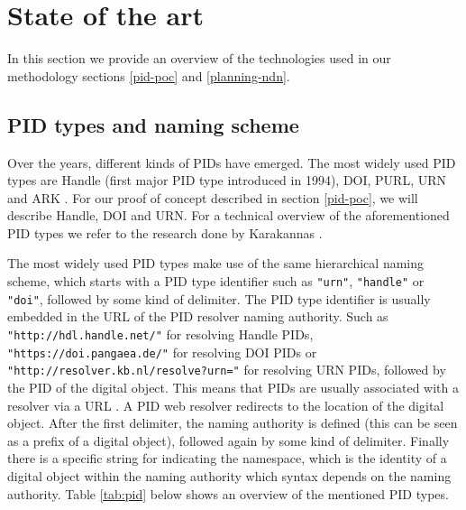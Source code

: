 \section{State of the art}
\label{tech-oview}

In this section we provide an overview of the technologies used in our methodology sections \ref{pid-poc} and \ref{planning-ndn}.

\subsection{PID types and naming scheme}\label{pid-types}
Over the years, different kinds of PIDs have emerged. The most widely used PID types are Handle (first major PID type introduced in 1994), DOI, PURL, URN and ARK \cite{pid-oview, odin, hdl}. For our proof of concept described in section \ref{pid-poc}, we will describe Handle, DOI and URN. For a technical overview of the aforementioned PID types we refer to the research done by Karakannas \cite{icn-bd}. 

The most widely used PID types make use of the same hierarchical naming scheme, which starts with a PID type identifier such as \texttt{"urn"}, \texttt{"handle"} or \texttt{"doi"}, followed by some kind of delimiter. The PID type identifier is usually embedded in the URL of the PID resolver naming authority. Such as \texttt{"http://hdl.handle.net/"} for resolving Handle PIDs, \texttt{"https://doi.pangaea.de/"} for resolving DOI PIDs or \texttt{"http://resolver.kb.nl/resolve?urn="} for resolving URN PIDs, followed by the PID of the digital object. This means that PIDs are usually associated with a resolver via a URL \cite{ids, icn-bd}. A PID web resolver redirects to the location of the digital object. After the first delimiter, the naming authority is defined (this can be seen as a prefix of a digital object), followed again by some kind of delimiter. Finally there is a specific string for indicating the namespace, which is the identity of a digital object within the naming authority which syntax depends on the naming
authority. Table \ref{tab:pid} below shows an overview of the mentioned PID types. 

